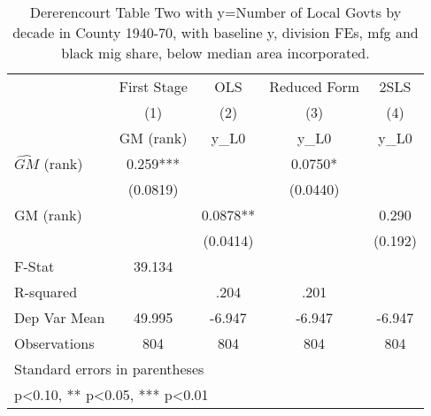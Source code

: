 \begin{table}[htbp]\centering
\def\sym#1{\ifmmode^{#1}\else\(^{#1}\)\fi}
\caption{Dererencourt Table Two with y=Number of Local Govts by decade in County 1940-70, with baseline y, division FEs, mfg and black mig share, below median area incorporated.}
\begin{tabular}{l*{4}{c}}
\toprule
                    & First Stage   &         OLS   &Reduced Form   &        2SLS   \\
                    &\multicolumn{1}{c}{(1)}&\multicolumn{1}{c}{(2)}&\multicolumn{1}{c}{(3)}&\multicolumn{1}{c}{(4)}\\
                    &\multicolumn{1}{c}{GM  (rank)}&\multicolumn{1}{c}{y\_L0}&\multicolumn{1}{c}{y\_L0}&\multicolumn{1}{c}{y\_L0}\\
\midrule
$\hat{GM}$ (rank)   &       0.259***&               &      0.0750*  &               \\
                    &    (0.0819)   &               &    (0.0440)   &               \\
\addlinespace
GM  (rank)          &               &      0.0878** &               &       0.290   \\
                    &               &    (0.0414)   &               &     (0.192)   \\
\midrule
F-Stat              &      39.134   &               &               &               \\
R-squared           &               &        .204   &        .201   &               \\
Dep Var Mean        &      49.995   &      -6.947   &      -6.947   &      -6.947   \\
Observations        &         804   &         804   &         804   &         804   \\
\bottomrule
\multicolumn{5}{l}{\footnotesize Standard errors in parentheses}\\
\multicolumn{5}{l}{\footnotesize * p<0.10, ** p<0.05, *** p<0.01}\\
\end{tabular}
\end{table}
